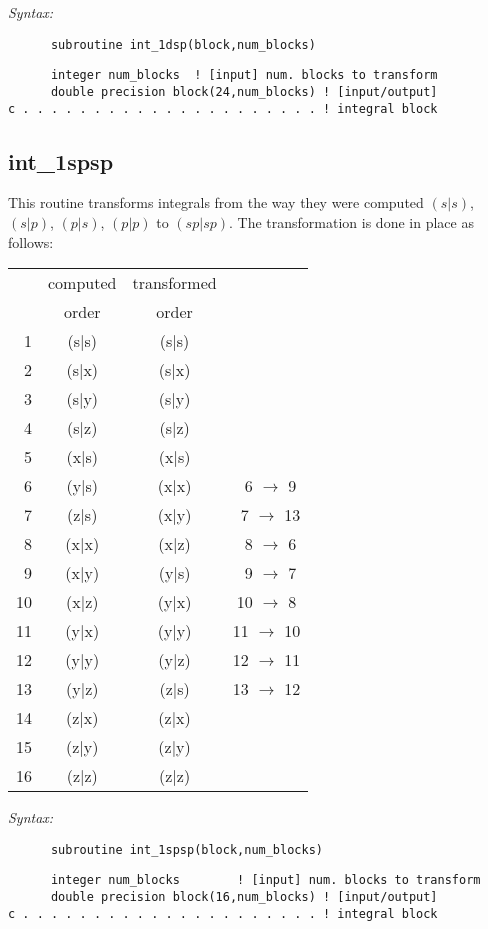 {\it Syntax:} 
\begin{verbatim} 
      subroutine int_1dsp(block,num_blocks) 
\end{verbatim} 
\begin{verbatim} 
      integer num_blocks  ! [input] num. blocks to transform 
      double precision block(24,num_blocks) ! [input/output]  
c . . . . . . . . . . . . . . . . . . . . . ! integral block 
\end{verbatim} 
\subsection{int\_1spsp} 
This routine transforms integrals from the way they 
were computed $(s|s)$, $(s|p)$, $(p|s)$, $(p|p)$   
to $(sp|sp)$. 
The transformation is done in place as follows: 
\begin{tabular}{rccc}       
  &  computed & transformed   &   \\ 
  &   order   &  order  &   \\ 
~1 & (s$|$s)  &  (s$|$s)  &   \\ 
~2 & (s$|$x)  &  (s$|$x)  &   \\ 
~3 & (s$|$y)  &  (s$|$y)  &   \\ 
~4 & (s$|$z)  &  (s$|$z)  &   \\ 
~5 & (x$|$s)  &  (x$|$s)  &   \\ 
~6 & (y$|$s)  &  (x$|$x)  &  ~6 $\rightarrow$ 9\\ 
~7 & (z$|$s)  &  (x$|$y)  &  ~7 $\rightarrow$ 13\\ 
~8 & (x$|$x)  &  (x$|$z)  &  ~8 $\rightarrow$ 6\\ 
~9 & (x$|$y)  &  (y$|$s)  &  ~9 $\rightarrow$ 7\\ 
10 & (x$|$z)  &  (y$|$x)  &  10 $\rightarrow$ 8 \\  
11 & (y$|$x)  &  (y$|$y)  &  11 $\rightarrow$ 10\\ 
12 & (y$|$y)  &  (y$|$z)  &  12 $\rightarrow$ 11\\ 
13 & (y$|$z)  &  (z$|$s)  &  13 $\rightarrow$ 12\\ 
14 & (z$|$x)  &  (z$|$x)  &   \\ 
15 & (z$|$y)  &  (z$|$y)  &   \\ 
16 & (z$|$z)  &  (z$|$z)  &   \\ 
\end{tabular} 
 
{\it Syntax:} 
\begin{verbatim} 
      subroutine int_1spsp(block,num_blocks) 
\end{verbatim} 
\begin{verbatim} 
      integer num_blocks        ! [input] num. blocks to transform 
      double precision block(16,num_blocks) ! [input/output]  
c . . . . . . . . . . . . . . . . . . . . . ! integral block 
\end{verbatim} 
